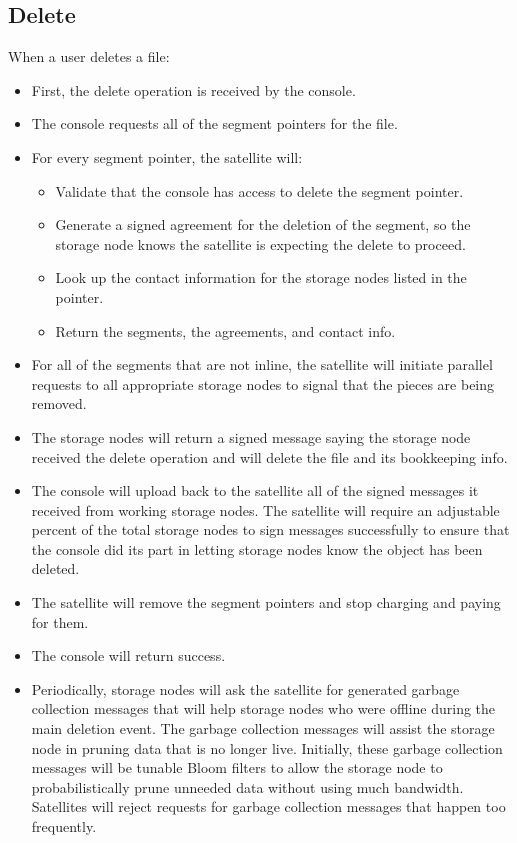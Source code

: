 \documentclass[11pt,fleqn,openany]{book}
\begin{document}
\subsection{Delete}

When a user deletes a file:

\begin{itemize}
\item First, the delete operation is received by the console.
\item The console requests all of the segment pointers for the file.
\item For every segment pointer, the satellite will:
  \begin{itemize}
  \item Validate that the console has access to delete the segment pointer.
  \item Generate a signed agreement for the deletion of the segment, so the
    storage node knows the satellite is expecting the delete to proceed.
  \item Look up the contact information for the storage nodes listed in the
  pointer.
  \item Return the segments, the agreements, and contact info.
  \end{itemize}
\item For all of the segments that are not inline, the satellite will
  initiate parallel requests to all appropriate storage nodes to signal that the
  pieces are being removed.
\item The storage nodes will return a signed message saying the storage node
received
the
  delete operation and will delete the file and its bookkeeping info.
\item The console will upload back to the satellite all of the signed
  messages it received from working storage nodes. The satellite will require an
  adjustable percent of the total storage nodes to sign messages successfully
  to ensure that the console did its part in letting storage nodes know the
  object
  has been deleted.
\item The satellite will remove the segment pointers and stop charging and
  paying for them.
\item The console will return success.
\item Periodically, storage nodes will ask the satellite for generated garbage
  collection messages that will help storage nodes who were offline during the
  main
  deletion event.
  The garbage collection messages will assist the storage node in pruning data
  that is
  no longer live. Initially, these garbage collection messages will be tunable
  Bloom filters to allow the storage node to probabilistically prune unneeded
  data
  without using much bandwidth.
  Satellites will reject requests for garbage collection messages that
  happen too frequently.
\end{itemize}
\end{document}
